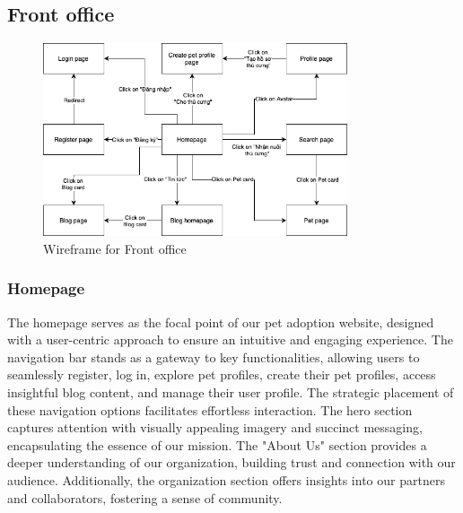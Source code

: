 \subsection{Front office}

\begin{figure}[H]
    \centering
    \includegraphics[width=0.8\textwidth]{Figures/wireframe_fo.png}
    \caption{Wireframe for Front office}
\end{figure}

\subsubsection{Homepage}

The homepage serves as the focal point of our pet adoption website, designed with a user-centric approach to ensure an intuitive and engaging experience. The navigation bar stands as a gateway to key functionalities, allowing users to seamlessly register, log in, explore pet profiles, create their pet profiles, access insightful blog content, and manage their user profile. The strategic placement of these navigation options facilitates effortless interaction. The hero section captures attention with visually appealing imagery and succinct messaging, encapsulating the essence of our mission. The "About Us" section provides a deeper understanding of our organization, building trust and connection with our audience. Additionally, the organization section offers insights into our partners and collaborators, fostering a sense of community.

